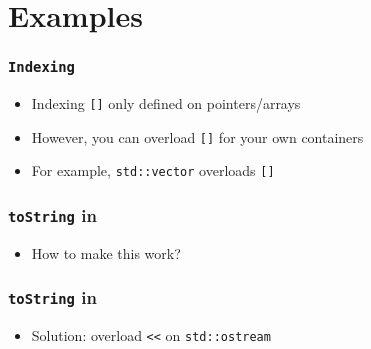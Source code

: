 \section{Examples}
\frame{\tableofcontents[currentsection]}

\begin{frame}
  \frametitle{\tt Indexing}
  \begin{itemize}
    \item Indexing \texttt{[]} only defined on pointers/arrays
    \item However, you can overload \texttt{[]} for your own containers
    \item For example, \texttt{std::vector} overloads \texttt{[]}
  \end{itemize}
\end{frame}

\begin{frame}
  \frametitle{\texttt{toString} in \cpp}
  \begin{itemize}
    \item How to make this work?
  \end{itemize}
\end{frame}

\begin{frame}
  \frametitle{\texttt{toString} in \cpp}
  \begin{itemize}
    \item Solution: overload \texttt{<<} on \texttt{std::ostream}
  \end{itemize}
\end{frame}


